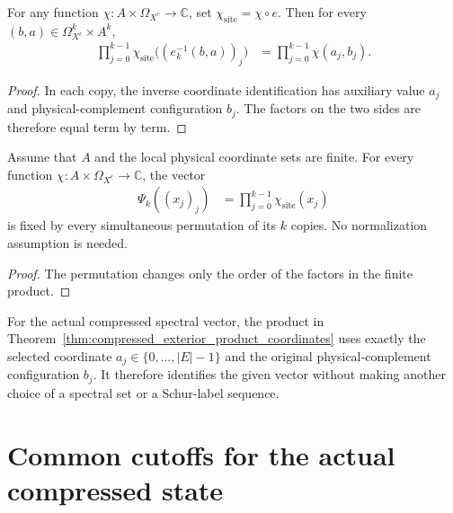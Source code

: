 \begin{theorem}
\label{thm:compressed_exterior_product_coordinates}
\leanok
{}
For any function $\chi:A\times\Omega_{X^c}\to\mathbb C$, set
$\chi_{\mathrm{site}}=\chi\circ e$. Then for every
$(b,a)\in\Omega_{X^c}^k\times A^k$,
\begin{align}
 \prod_{j=0}^{k-1}\chi_{\mathrm{site}}\bigl((e_k^{-1}(b,a))_j\bigr)
 &=\prod_{j=0}^{k-1}\chi(a_j,b_j).
\end{align}
\end{theorem}
\begin{proof}
\leanok
In each copy, the inverse coordinate identification has auxiliary value
$a_j$ and physical-complement configuration $b_j$. The factors on the two
sides are therefore equal term by term.
\end{proof}

\begin{theorem}
\label{thm:compressed_site_product_symmetry}
\leanok
{}
Assume that $A$ and the local physical coordinate sets are finite. For
every function $\chi:A\times\Omega_{X^c}\to\mathbb C$, the vector
\begin{align}
 \Psi_k((x_j)_j)&=\prod_{j=0}^{k-1}\chi_{\mathrm{site}}(x_j)
\end{align}
is fixed by every simultaneous permutation of its $k$ copies. No
normalization assumption is needed.
\end{theorem}
\begin{proof}
\leanok
The permutation changes only the order of the factors in the finite
product.
\end{proof}

For the actual compressed spectral vector, the product in
Theorem~\ref{thm:compressed_exterior_product_coordinates} uses exactly
the selected coordinate $a_j\in\{0,\ldots,|E|-1\}$ and the original
physical-complement configuration $b_j$. It therefore identifies the
given vector without making another choice of a spectral set or a
Schur-label sequence.

\section{Common cutoffs for the actual compressed state}
\label{sec:compressed_typical_common_cutoffs}

